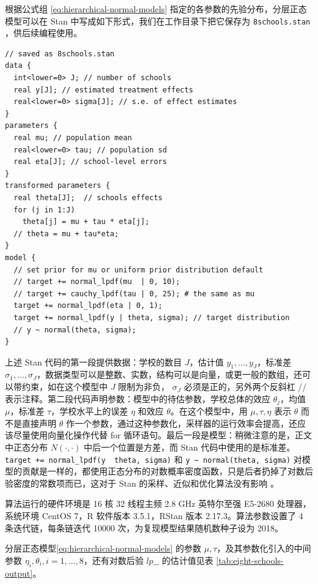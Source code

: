 \documentclass[12pt,a4paper,UTF8,twoside]{book}
\theoremstyle{definition}
\theoremstyle{definition}
\theoremstyle{definition}
\theoremstyle{remark}
\begin{document}
根据公式组 \eqref{eq:hierarchical-normal-models}
指定的各参数的先验分布，分层正态模型可以在 Stan
中写成如下形式，我们在工作目录下把它保存为 \texttt{8schools.stan}
，供后续编程使用。

\begin{verbatim}
// saved as 8schools.stan
data {
  int<lower=0> J; // number of schools 
  real y[J]; // estimated treatment effects
  real<lower=0> sigma[J]; // s.e. of effect estimates 
}
parameters {
  real mu; // population mean
  real<lower=0> tau; // population sd
  real eta[J]; // school-level errors
}
transformed parameters {
  real theta[J];  // schools effects
  for (j in 1:J)
    theta[j] = mu + tau * eta[j];
  // theta = mu + tau*eta;
}
model {
  // set prior for mu or uniform prior distribution default
  // target += normal_lpdf(mu  | 0, 10); 
  // target += cauchy_lpdf(tau | 0, 25); # the same as mu
  target += normal_lpdf(eta | 0, 1);
  target += normal_lpdf(y | theta, sigma); // target distribution
  // y ~ normal(theta, sigma);
}
\end{verbatim}

上述 Stan 代码的第一段提供数据：学校的数目 \(J\)，估计值
\(y_1,\ldots,y_{J}\)，标准差
\(\sigma_1,\ldots,\sigma_{J}\)，数据类型可以是整数、实数，结构可以是向量，或更一般的数组，还可以带约束，如在这个模型中
\(J\) 限制为非负， \(\sigma_{J}\) 必须是正的，另外两个反斜杠 //
表示注释。第二段代码声明参数：模型中的待估参数，学校总体的效应
\(\theta_j\)，均值 \(\mu\)，标准差 \(\tau\)，学校水平上的误差 \(\eta\)
和效应 \(\theta\)。在这个模型中，用 \(\mu,\tau,\eta\) 表示 \(\theta\)
而不是直接声明 \(\theta\)
作一个参数，通过这种参数化，采样器的运行效率会提高，还应该尽量使用向量化操作代替
for 循环语句。最后一段是模型：稍微注意的是，正文中正态分布
\(N(\cdot,\cdot)\) 中后一个位置是方差，而 Stan
代码中使用的是标准差。\texttt{target\ +=\ normal\_lpdf(y\ \textbar{}\ theta,\ sigma)}
和 \texttt{y\ \textasciitilde{}\ normal(theta,\ sigma)}
对模型的贡献是一样的，都使用正态分布的对数概率密度函数，只是后者扔掉了对数后验密度的常数项而已，这对于
Stan 的采样、近似和优化算法没有影响 \citep{Stan2017JSS}。

算法运行的硬件环境是 16 核 32 线程主频 2.8 GHz 英特尔至强 E5-2680
处理器，系统环境 CentOS 7，R 软件版本 3.5.1，RStan 版本
2.17.3。算法参数设置了 4 条迭代链，每条链迭代 10000
次，为复现模型结果随机数种子设为 2018。

分层正态模型\eqref{eq:hierarchical-normal-models} 的参数
\(\mu,\tau\)，及其参数化引入的中间参数
\(\eta_i,\theta_i,i=1,\ldots,8\)，还有对数后验 \(lp\_\_\) 的估计值见表
\ref{tab:eight-schools-output}。
\end{document}
